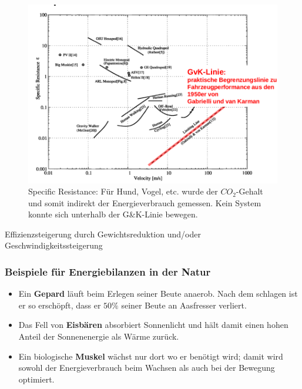 \begin{figure}
	\includegraphics[width=\textwidth]{figures/specific_resistance.png}
	\caption{Specific Resistance: Für Hund, Vogel, etc. wurde der $CO_2$-Gehalt und somit indirekt der Energieverbrauch gemessen. Kein System konnte sich unterhalb der G\&K-Linie bewegen.}
\end{figure}

Effizienzsteigerung durch Gewichtsreduktion und/oder Geschwindigkeitssteigerung

\subsubsection{Beispiele für Energiebilanzen in der Natur}
\begin{itemize}
	\item Ein \textbf{Gepard} läuft beim Erlegen seiner Beute anaerob. Nach dem schlagen ist er so erschöpft, dass er $50\%$ seiner Beute an Aasfresser verliert.
	\item Das Fell von \textbf{Eisbären} absorbiert Sonnenlicht und hält damit einen hohen Anteil der Sonnenenergie als Wärme zurück.
	\item Ein biologische \textbf{Muskel} wächst nur dort wo er benötigt wird; damit wird sowohl der Energieverbrauch beim Wachsen als auch bei der Bewegung optimiert.
\end{itemize}